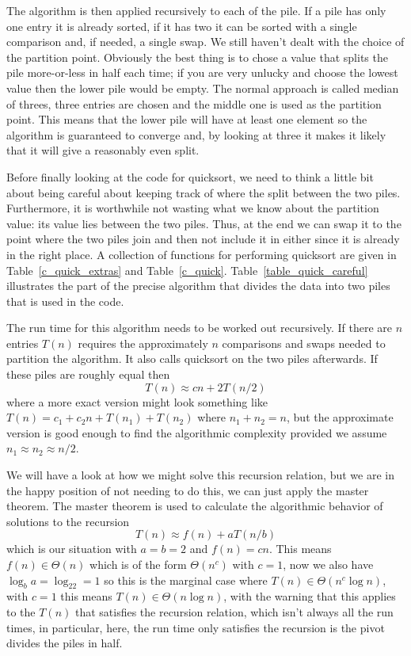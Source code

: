 \documentclass[11pt,a4paper]{scrartcl}
\begin{document}
The algorithm is then applied recursively to each of the pile. If a
pile has only one entry it is already sorted, if it has two it can be
sorted with a single comparison and, if needed, a single swap. We still
haven't dealt with the choice of the partition point. Obviously the
best thing is to chose a value that splits the pile more-or-less in
half each time; if you are very unlucky and choose the lowest value
then the lower pile would be empty. The normal approach is called
median of threes, three entries are chosen and the middle one is used
as the partition point. This means that the lower pile will have at
least one element so the algorithm is guaranteed to converge and, by
looking at three it makes it likely that it will give a reasonably
even split.

Before finally looking at the code for quicksort, we need to think a
little bit about being careful about keeping track of where the split
between the two piles. Furthermore, it is worthwhile not wasting what
we know about the partition value: its value lies between the two
piles. Thus, at the end we can swap it to the point where the two
piles join and then not include it in either since it is already in
the right place. A collection of functions for performing quicksort
are given in Table~\ref{c_quick_extras} and
Table~\ref{c_quick}. Table~\ref{table_quick_careful} illustrates
the part of the precise algorithm that divides the data into two piles
that is used in the code.

The run time for this algorithm needs to be worked out recursively. If
there are $n$ entries $T(n)$ requires the approximately $n$
comparisons and swaps needed to partition the algorithm. It also calls
quicksort on the two piles afterwards. If these piles are roughly
equal then
\begin{equation}
T(n)\approx cn+2T(n/2)
\end{equation}
where a more exact version might look something like $T(n)=c_1+c_2n +
T(n_1)+T(n_2)$ where $n_1+n_2=n$, but the approximate version is good
enough to find the algorithmic complexity provided we assume
$n_1\approx n_2\approx n/2$. 

We will have a look at how we might solve this recursion relation, but
we are in the happy position of not needing to do this, we can just
apply the master theorem. The master theorem is used to calculate the algorithmic behavior of solutions to the recursion
\begin{equation}
T(n)\approx f(n)+aT(n/b)
\end{equation}
which is our situation with $a=b=2$ and $f(n)=cn$. This means $f(n)\in
\Theta(n)$ which is of the form $\Theta(n^c)$ with $c=1$, now we also
have $\log_ba=\log_22=1$ so this is the marginal case where $T(n)\in
\Theta(n^c\log n)$, with $c=1$ this means $T(n)\in \Theta(n\log n)$,
with the warning that this applies to the $T(n)$ that satisfies the
recursion relation, which isn't always all the run times, in
particular, here, the run time only satisfies the recursion is the
pivot divides the piles in half.
\end{document}
